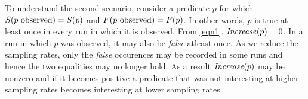 To understand the second scenario, consider a predicate $p$ for which
$S(\text{$p$ observed}) = S(p)$ and $F(\text{$p$ observed}) = F(p)$.
In other words, $p$ is true at least once in every run in which it is
observed.  From \autoref{eqn1}, $\mathit{Increase}(p) = 0$.  In a run 
in which $p$ was observed, it may also be \emph{false} atleast once.  As we
reduce the sampling rates, only the \emph{false} occurences may be recorded
in some runs and hence the two equalities may no longer hold.  As a result
$\mathit{Increase}(p)$ may be nonzero and if it becomes positive a predicate that
was not interesting at higher sampling rates becomes interesting at lower 
sampling rates.
